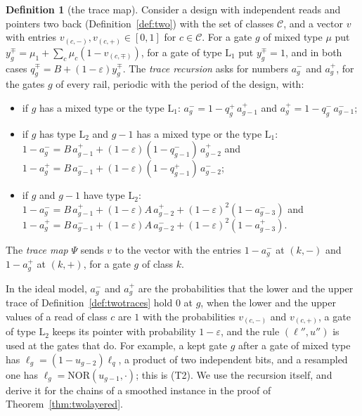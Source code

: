 \documentclass[11pt]{amsart}
\theoremstyle{definition}
\newtheorem{definition}[theorem]{Definition}
\theoremstyle{remark}
\newcommand{\eps}{\varepsilon}
\newcommand{\NOR}{\mathrm{NOR}}
\begin{document}
\begin{definition}[the trace map]\label{def:tracemap}
Consider a design with independent reads and pointers two back (Definition~\ref{def:two}) with
the set of classes $\mathcal C$, and a vector $v$ with entries $v_{(c,-)},v_{(c,+)}\in[0,1]$ for
$c\in\mathcal C$. For a gate $g$ of mixed type $\mu$ put
$y^\mp_g=\mu_1+\sum_c\mu_c(1-v_{(c,\mp)})$, for a gate of type $\mathrm L_1$ put $y^\mp_g=1$,
and in both cases $q^\mp_g=B+(1-\eps)y^\mp_g$. The \emph{trace recursion} asks for numbers
$a^-_g$ and $a^+_g$, for the gates $g$ of every rail, periodic with the period of the design,
with:
\begin{itemize}[leftmargin=3.2em]
\item[(T1)] if $g$ has a mixed type or the type $\mathrm L_1$:
$a^-_g=1-q^+_g\,a^+_{g-1}$ and $a^+_g=1-q^-_g\,a^-_{g-1}$;
\item[(T2)] if $g$ has type $\mathrm L_2$ and $g-1$ has a mixed type or the type $\mathrm L_1$:
$1-a^-_g=B\,a^+_{g-1}+(1-\eps)(1-q^-_{g-1})\,a^+_{g-2}$ and
$1-a^+_g=B\,a^-_{g-1}+(1-\eps)(1-q^+_{g-1})\,a^-_{g-2}$;
\item[(T3)] if $g$ and $g-1$ have type $\mathrm L_2$:
$1-a^-_g=B\,a^+_{g-1}+(1-\eps)A\,a^+_{g-2}+(1-\eps)^2(1-a^-_{g-3})$ and
$1-a^+_g=B\,a^-_{g-1}+(1-\eps)A\,a^-_{g-2}+(1-\eps)^2(1-a^+_{g-3})$.
\end{itemize}
The \emph{trace map} $\Psi$ sends $v$ to the vector with the entries $1-a^-_g$ at $(k,-)$ and
$1-a^+_g$ at $(k,+)$, for a gate $g$ of class $k$.
\end{definition}

\noindent In the ideal model, $a^-_g$ and $a^+_g$ are the probabilities that the lower and the
upper trace of Definition~\ref{def:twotraces} hold $0$ at $g$, when the lower and the upper
values of a read of class $c$ are $1$ with the probabilities $v_{(c,-)}$ and $v_{(c,+)}$, a
gate of type $\mathrm L_2$ keeps its pointer with probability $1-\eps$, and the rule
$(\ell'',u'')$ is used at the gates that do. For example, a kept gate $g$ after a gate of mixed
type has $\ell_g=(1-u_{g-2})\ell_q$, a product of two independent bits, and a resampled one has
$\ell_g=\NOR(u_{g-1},\cdot)$; this is (T2). We use the recursion itself, and derive it for the
chains of a smoothed instance in the proof of Theorem~\ref{thm:twolayered}.
\end{document}
